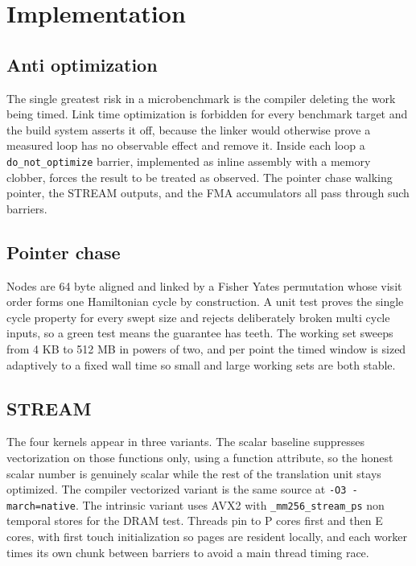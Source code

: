\chapter{Implementation}

\section{Anti optimization}

The single greatest risk in a microbenchmark is the compiler deleting the work
being timed. Link time optimization is forbidden for every benchmark target and
the build system asserts it off, because the linker would otherwise prove a
measured loop has no observable effect and remove it. Inside each loop a
\texttt{do\_not\_optimize} barrier, implemented as inline assembly with a memory
clobber, forces the result to be treated as observed. The pointer chase walking
pointer, the STREAM outputs, and the FMA accumulators all pass through such
barriers.

\section{Pointer chase}

Nodes are 64 byte aligned and linked by a Fisher Yates permutation whose visit
order forms one Hamiltonian cycle by construction. A unit test proves the single
cycle property for every swept size and rejects deliberately broken multi cycle
inputs, so a green test means the guarantee has teeth. The working set sweeps
from 4 KB to 512 MB in powers of two, and per point the timed window is sized
adaptively to a fixed wall time so small and large working sets are both stable.

\section{STREAM}

The four kernels appear in three variants. The scalar baseline suppresses
vectorization on those functions only, using a function attribute, so the honest
scalar number is genuinely scalar while the rest of the translation unit stays
optimized. The compiler vectorized variant is the same source at \texttt{-O3
-march=native}. The intrinsic variant uses AVX2 with \texttt{\_mm256\_stream\_ps}
non temporal stores for the DRAM test. Threads pin to P cores first and then E
cores, with first touch initialization so pages are resident locally, and each
worker times its own chunk between barriers to avoid a main thread timing race.

